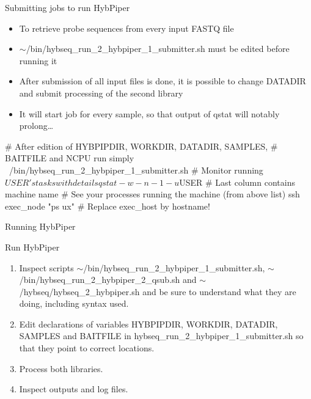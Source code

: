 \documentclass[compress, ucs, xelatex, 11pt, xcolor=x11names, aspectratio=1609,
	hyperref={
		bookmarks=true,
		unicode=true,
		colorlinks=true,
		pdftitle={HybSeq course},
		plainpages=false,
		pdfauthor={Vojtech Zeisek},
		pdfsubject={Practical processing of HybSeq target enrichment sequencing data on computing grids like MetaCentrum},
		pdfcreator={XeLaTeX},
		pdfkeywords={BASH, command line, GNU, HybSeq, Linux, MetaCentrum, sequencing shell, target enrichment},
		linkcolor=Cyan2, %
		anchorcolor=Firebrick2, %
		citecolor=Firebrick2, %
		filecolor=Firebrick2, %
		menucolor=Firebrick2, %
		urlcolor=Chartreuse2, %
		pdftex},
	url={hyphens, lowtilde} %
	]{beamer}
\renewcommand{\texttt}[1]{\colorbox{Snow4}{{\ttfamily #1}}}
\renewcommand{\alert}[1]{\textcolor{OrangeRed2}{#1}}
\begin{document}
\begin{frame}[fragile]{Submitting jobs to run HybPiper}
	\begin{itemize}
		\item To retrieve probe sequences from every input FASTQ file
		\item \alert{\texttt{$\sim$/bin/hybseq\_run\_2\_hybpiper\_1\_submitter.sh} must be edited before running it}
		\item After submission of all input files is done, it is possible to change \texttt{DATADIR} and submit processing of the second library
		\item It will start job for every sample, so that output of \texttt{qstat} will notably prolong\ldots
	\end{itemize}
	\begin{bashcode}
    # After edition of HYBPIPDIR, WORKDIR, DATADIR, SAMPLES,
    # BAITFILE and NCPU run simply
    ~/bin/hybseq_run_2_hybpiper_1_submitter.sh
    # Monitor running $USER's tasks with details
    qstat -w -n -1 -u $USER # Last column contains machine name
    # See your processes running the machine (from above list)
    ssh exec_node "ps ux" # Replace exec_host by hostname!
	\end{bashcode}
\end{frame}

\begin{frame}{Running HybPiper}
	\begin{exampleblock}{Run HybPiper}
		\begin{enumerate}
			\item Inspect scripts \texttt{$\sim$/bin/hybseq\_run\_2\_hybpiper\_1\_submitter.sh}, \texttt{$\sim$/bin/hybseq\_run\_2\_hybpiper\_2\_qsub.sh} and \texttt{$\sim$/hybseq/hybseq\_2\_hybpiper.sh} and be sure to understand what they are doing, including syntax used.
			\item Edit declarations of variables \texttt{HYBPIPDIR}, \texttt{WORKDIR}, \texttt{DATADIR}, \texttt{SAMPLES} and \texttt{BAITFILE} in \texttt{hybseq\_run\_2\_hybpiper\_1\_submitter.sh} so that they point to correct locations.
			\item Process both libraries.
			\item Inspect outputs and log files.
		\end{enumerate}
	\end{exampleblock}
\end{frame}
\end{document}
